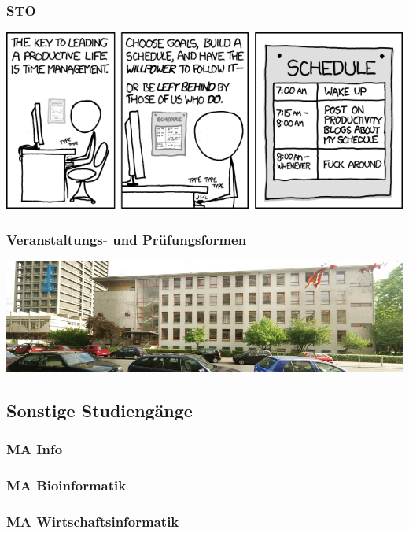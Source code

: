 \documentclass[12pt,a4paper]{scrartcl}
\begin{document}
\subsubsection{STO}

\begin{center}
	\includegraphics[scale=0.8]{comics/time_management.png}
\end{center}
\newpage
\subsubsection{Veranstaltungs- und Prüfungsformen}



	\begin{center}
		\includegraphics[scale=1.0]{bilder/rm_pano}
	\end{center}
\subsection{Sonstige Studiengänge}
	\subsubsection{MA Info}
	
	\subsubsection{MA Bioinformatik}
	
	\subsubsection{MA Wirtschaftsinformatik}
\newpage
\end{document}
